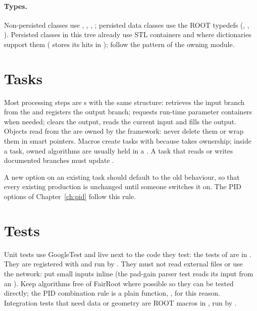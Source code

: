 \paragraph{Types.} Non-persisted classes use , , , ; persisted
data classes use the ROOT typedefs (, , ). Persisted classes in this tree
already use STL containers and  where dictionaries support them ( stores its hits
in ); follow the pattern of the owning module.

\section{Tasks}

Most processing steps are s with the same structure:  retrieves the input branch from the
 and registers the output branch;  requests run-time parameter
containers when needed;  clears the output, reads the current input and fills the output. Objects read
from the  are owned by the framework: never delete them or wrap them in smart pointers. Macros
create tasks with  because  takes ownership; inside a task, owned algorithms are usually held
in a . A task that reads or writes documented branches must update
.

A new option on an existing task should default to the old behaviour, so that every existing production is
unchanged until someone switches it on. The PID options of Chapter~\ref{ch:pid} follow this rule.

\section{Tests}

Unit tests use GoogleTest and live next to the code they test: the tests of  are in
. They are registered with  and run by . They must not
read external files or use the network: put small inputs inline (the pad-gain parser test reads its input from an
). Keep algorithms free of FairRoot where possible so they can be tested directly; the PID
combination rule is a plain function, , for this reason. Integration tests that need data or
geometry are ROOT macros in , run by .

